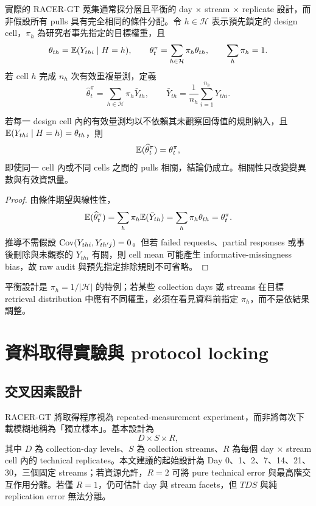 \documentclass[12pt,a4paper,oneside]{article}
\begin{document}
實際的 RACER-GT 蒐集通常採分層且平衡的 day $\times$ stream $\times$ replicate 設計，而非假設所有 pulls 具有完全相同的條件分配。令 $h\in\mathcal{H}$ 表示預先鎖定的 design cell，$\pi_h$ 為研究者事先指定的目標權重，且
\begin{equation}
\theta_{th}=\mathbb{E}(Y_{thi}\mid H=h),
\qquad
\theta_t^{\pi}=\sum_{h\in\mathcal{H}}\pi_h\theta_{th},
\qquad \sum_h\pi_h=1.
\label{eq:stratifiedestimand}
\end{equation}
若 cell $h$ 完成 $n_h$ 次有效重複量測，定義
\begin{equation}
\widehat\theta_t^{\pi}
=\sum_{h\in\mathcal{H}}\pi_h\bar Y_{th},
\qquad
\bar Y_{th}=\frac{1}{n_h}\sum_{i=1}^{n_h}Y_{thi}.
\label{eq:stratifiedestimator}
\end{equation}

\begin{proposition}[分層設計估計量的無偏性]
若每一 design cell 內的有效量測均以不依賴其未觀察回傳值的規則納入，且 $\mathbb{E}(Y_{thi}\mid H=h)=\theta_{th}$，則
\begin{equation}
\mathbb{E}(\widehat\theta_t^{\pi})=\theta_t^{\pi},
\end{equation}
即使同一 cell 內或不同 cells 之間的 pulls 相關，結論仍成立。相關性只改變變異數與有效資訊量。
\end{proposition}

\begin{proof}
由條件期望與線性性，
\[
\mathbb{E}(\widehat\theta_t^{\pi})
=\sum_h\pi_h\mathbb{E}(\bar Y_{th})
=\sum_h\pi_h\theta_{th}
=\theta_t^{\pi}.
\]
推導不需假設 $\operatorname{Cov}(Y_{thi},Y_{th'j})=0$。但若 failed requests、partial responses 或事後刪除與未觀察的 $Y_{thi}$ 有關，則 cell mean 可能產生 informative-missingness bias，故 raw audit 與預先指定排除規則不可省略。
\end{proof}

平衡設計是 $\pi_h=1/|\mathcal{H}|$ 的特例；若某些 collection days 或 streams 在目標 retrieval distribution 中應有不同權重，必須在看見資料前指定 $\pi_h$，而不是依結果調整。

\section{資料取得實驗與 protocol locking}\label{sec:design-zh}

\subsection{交叉因素設計}

RACER-GT 將取得程序視為 repeated-measurement experiment，而非將每次下載模糊地稱為「獨立樣本」。基本設計為
\begin{equation}
D\times S\times R,
\end{equation}
其中 $D$ 為 collection-day levels、$S$ 為 collection streams、$R$ 為每個 day $\times$ stream cell 內的 technical replicates。本文建議的起始設計為 Day 0、1、2、7、14、21、30，三個固定 streams；若資源允許，$R=2$ 可將 pure technical error 與最高階交互作用分離。若僅 $R=1$，仍可估計 day 與 stream facets，但 $TDS$ 與純 replication error 無法分離。
\end{document}
